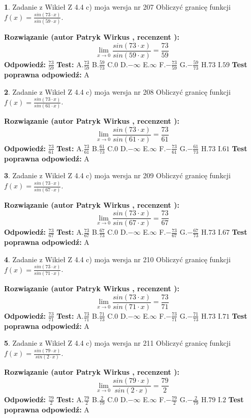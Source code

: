 \documentclass[12pt, a4paper]{article}
\theoremstyle{definition} %
\newtheorem{zad}{}
\newcommand{\zadStart}[1]{\begin{zad}#1\newline}
\newcommand{\zadStop}{\end{zad}}
\newcommand{\rozwStart}[2]{\noindent \textbf{Rozwiązanie (autor #1 , recenzent #2): }\newline}
\newcommand{\rozwStop}{\newline}
\newcommand{\odpStart}{\noindent \textbf{Odpowiedź:}\newline}
\newcommand{\odpStop}{\newline}
\newcommand{\testStart}{\noindent \textbf{Test:}\newline}
\newcommand{\testStop}{\newline}
\newcommand{\kluczStart}{\noindent \textbf{Test poprawna odpowiedź:}\newline}
\newcommand{\kluczStop}{\newline}
\begin{document}
\zadStart{Zadanie z Wikieł Z 4.4 c) moja wersja nr 207}
Obliczyć granicę funkcji $f(x)=\frac{sin(73\cdot x)}{sin(59\cdot x)}$.
\zadStop
\rozwStart{Patryk Wirkus}{}
$$\lim\limits_{x\to 0}\frac{sin(73\cdot x)}{sin(59\cdot x)}=
\frac{73}{59}$$
\rozwStop
\odpStart
$\frac{73}{59}$
\odpStop
\testStart
A.$\frac{73}{59}$
B.$\frac{59}{73}$
C.$0$
D.$-\infty$
E.$\infty$
F.$-\frac{73}{59}$
G.$-\frac{59}{73}$
H.$73$
I.$59$
\testStop
\kluczStart
A
\kluczStop



\zadStart{Zadanie z Wikieł Z 4.4 c) moja wersja nr 208}
Obliczyć granicę funkcji $f(x)=\frac{sin(73\cdot x)}{sin(61\cdot x)}$.
\zadStop
\rozwStart{Patryk Wirkus}{}
$$\lim\limits_{x\to 0}\frac{sin(73\cdot x)}{sin(61\cdot x)}=
\frac{73}{61}$$
\rozwStop
\odpStart
$\frac{73}{61}$
\odpStop
\testStart
A.$\frac{73}{61}$
B.$\frac{61}{73}$
C.$0$
D.$-\infty$
E.$\infty$
F.$-\frac{73}{61}$
G.$-\frac{61}{73}$
H.$73$
I.$61$
\testStop
\kluczStart
A
\kluczStop



\zadStart{Zadanie z Wikieł Z 4.4 c) moja wersja nr 209}
Obliczyć granicę funkcji $f(x)=\frac{sin(73\cdot x)}{sin(67\cdot x)}$.
\zadStop
\rozwStart{Patryk Wirkus}{}
$$\lim\limits_{x\to 0}\frac{sin(73\cdot x)}{sin(67\cdot x)}=
\frac{73}{67}$$
\rozwStop
\odpStart
$\frac{73}{67}$
\odpStop
\testStart
A.$\frac{73}{67}$
B.$\frac{67}{73}$
C.$0$
D.$-\infty$
E.$\infty$
F.$-\frac{73}{67}$
G.$-\frac{67}{73}$
H.$73$
I.$67$
\testStop
\kluczStart
A
\kluczStop



\zadStart{Zadanie z Wikieł Z 4.4 c) moja wersja nr 210}
Obliczyć granicę funkcji $f(x)=\frac{sin(73\cdot x)}{sin(71\cdot x)}$.
\zadStop
\rozwStart{Patryk Wirkus}{}
$$\lim\limits_{x\to 0}\frac{sin(73\cdot x)}{sin(71\cdot x)}=
\frac{73}{71}$$
\rozwStop
\odpStart
$\frac{73}{71}$
\odpStop
\testStart
A.$\frac{73}{71}$
B.$\frac{71}{73}$
C.$0$
D.$-\infty$
E.$\infty$
F.$-\frac{73}{71}$
G.$-\frac{71}{73}$
H.$73$
I.$71$
\testStop
\kluczStart
A
\kluczStop



\zadStart{Zadanie z Wikieł Z 4.4 c) moja wersja nr 211}
Obliczyć granicę funkcji $f(x)=\frac{sin(79\cdot x)}{sin(2\cdot x)}$.
\zadStop
\rozwStart{Patryk Wirkus}{}
$$\lim\limits_{x\to 0}\frac{sin(79\cdot x)}{sin(2\cdot x)}=
\frac{79}{2}$$
\rozwStop
\odpStart
$\frac{79}{2}$
\odpStop
\testStart
A.$\frac{79}{2}$
B.$\frac{2}{79}$
C.$0$
D.$-\infty$
E.$\infty$
F.$-\frac{79}{2}$
G.$-\frac{2}{79}$
H.$79$
I.$2$
\testStop
\kluczStart
A
\kluczStop
\end{document}

